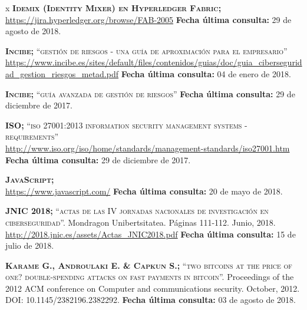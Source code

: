 \begin{thebibliography} {x}
	 \textsc{\textbf{Idemix (Identity Mixer) en Hyperledger Fabric; }} \\ 
	\url{https://jira.hyperledger.org/browse/FAB-2005} 
	\newline \textbf{Fecha última consulta:} 29 de agosto de 2018.
		
	 \textsc{\textbf{Incibe; }}\textsc{“gestión de riesgos - una guía de aproximación para el empresario”} \\
	\url{https://www.incibe.es/sites/default/files/contenidos/guias/doc/guia_ciberseguridad_gestion_riesgos_metad.pdf}
	\newline \textbf{Fecha última consulta:} 04 de enero de 2018.
		
	 \textsc{\textbf{Incibe; }}\textsc{“guía avanzada de gestión de riesgos”}
	\newline \textbf{Fecha última consulta:} 29 de diciembre de 2017.
		
	 \textsc{\textbf{ISO; }}\textsc{“iso 27001:2013 information security management systems - requirements”} \\
	\url{http://www.iso.org/iso/home/standards/management-standards/iso27001.htm}
	\newline \textbf{Fecha última consulta:} 29 de diciembre de 2017.
		
	 \textsc{\textbf{JavaScript; }} \\ 
	\url{https://www.javascript.com/}
	\newline \textbf{Fecha última consulta:} 20 de mayo de 2018.
		
	 \textsc{\textbf{JNIC 2018; }}\textsc{“actas de las IV jornadas nacionales de investigación en ciberseguridad”.} Mondragon Unibertsitatea. Páginas 111-112. Junio, 2018. \\
	\url{http://2018.jnic.es/assets/Actas_JNIC2018.pdf}
	\newline \textbf{Fecha última consulta:} 15 de julio de 2018.
	
	 \textsc{\textbf{Karame G., Androulaki E. \& Capkun S.; }}\textsc{“two bitcoins at the price of one? double-spending attacks on fast payments in bitcoin”.} Proceedings of the 2012 ACM conference on Computer and communications security. October, 2012. DOI: 10.1145/2382196.2382292. 
	\newline \textbf{Fecha última consulta:} 03 de agosto de 2018.
	

\end{thebibliography}

